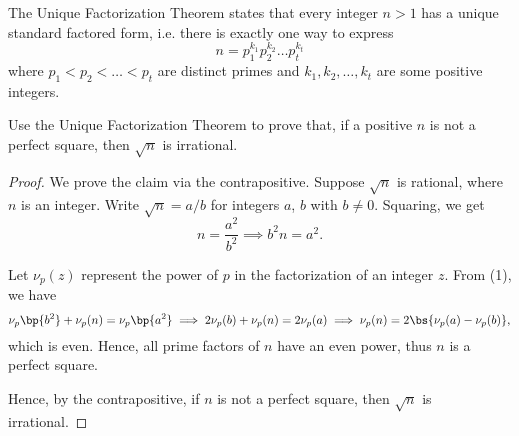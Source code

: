 \begin{problem}
    The Unique Factorization Theorem states that every integer $n > 1$ has a unique standard factored form, i.e. there is exactly one way to express \[n = p_1^{k_1} p_2^{k_2} \dots p_t^{k_t}\] where $p_1 < p_2 < \dots < p_t$ are distinct primes and $k_1, k_2, \dots, k_t$ are some positive integers.

    Use the Unique Factorization Theorem to prove that, if a positive $n$ is not a perfect square, then $\sqrt{n}$ is irrational.
\end{problem}
\begin{proof}
    We prove the claim via the contrapositive. Suppose $\sqrt n$ is rational, where $n$ is an integer. Write $\sqrt{n} = a/b$ for integers $a$, $b$ with $b \neq 0$. Squaring, we get \[n = \frac{a^2}{b^2} \implies b^2 n = a^2 \tag{1}.\] 
    
    Let $\nu_p(z)$ represent the power of $p$ in the factorization of an integer $z$. From (1), we have \[\nu_p\bp{b^2} + \nu_p(n) = \nu_p\bp{a^2} \implies 2\nu_p(b) + \nu_p(n) = 2 \nu_p(a) \implies \nu_p(n) = 2\bs{\nu_p(a) - \nu_p(b)},\] which is even. Hence, all prime factors of $n$ have an even power, thus $n$ is a perfect square.

    Hence, by the contrapositive, if $n$ is not a perfect square, then $\sqrt{n}$ is irrational.
\end{proof}